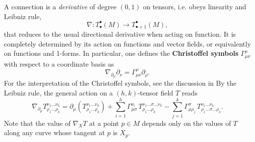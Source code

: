\documentclass[../geometry_main.tex]{subfiles}
\begin{document}
\begin{mytheorem}[Connection]
A connection is a \emph{derivative} of degree $(0,1)$ on tensors, i.e. obeys linearity and Leibniz rule,
\begin{equation}
    \nabla: T^{\bullet}_{\bullet} (M) \to T^{\bullet}_{\bullet + 1} (M),
\end{equation}
that reduces to the usual directional derivative when acting on function.
It is completely determined by its action on functions and vector fields, or equivalently on functions and 1-forms.
In particular, one defines the \textbf{Christoffel symbols} $\Gamma^{\rho}_{\mu \nu}$ with respect to a coordinate basis as
\begin{equation}
    \nabla_{\partial_\mu} \partial_\nu = \Gamma^{\rho}_{\mu \nu} \partial_\rho.
\end{equation}
For the interpretation of the Christoffel symbols, see the discussion in 
By the Leibniz rule, the general action on a $(h,k)$-tensor field $T$ reads
\begin{equation}\label{eq:connection_on_tensor}
    \nabla_{\partial_\mu} T^{\nu_1 \dots \nu_h}_{ \rho_1 \dots \rho_k} 
    = \partial_\mu\left( T^{\nu_1 \dots \nu_h}_{ \rho_1 \dots \rho_k} \right)
    + \sum_{i=1}^h \Gamma^{\nu_i}_{\mu \sigma} \,T^{\nu_1 \dots \sigma \dots \nu_h}_{ \rho_1 \dots \rho_k} 
    - \sum_{j=1}^k \Gamma^{\sigma}_{\mu \rho_j}\, T^{\nu_1 \dots \nu_h}_{\rho_1 \dots \sigma \dots \rho_k}.
\end{equation}
Note that the value of $\nabla_X T$ at a point $p\in M$ depends only on the values of $T$ along any curve whose tangent at $p$ is $X_p$.
\end{mytheorem}
\end{document}
